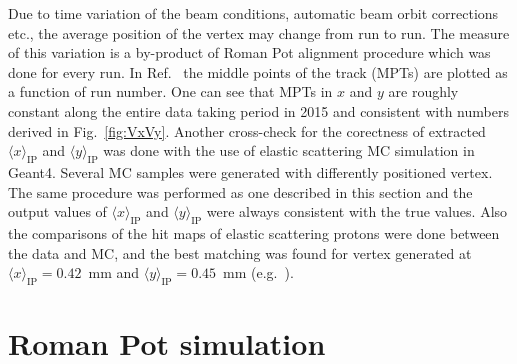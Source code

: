 Due to time variation of the beam conditions, automatic beam orbit corrections etc., the average position of the vertex may change from run to run. The measure of this variation is a by-product of Roman Pot alignment procedure which was done for every run. In Ref.~\cite{AverageVertexBogdan} the middle points of the track (MPTs) are plotted as a function of run number. One can see that MPTs in $x$ and $y$ are roughly constant along the entire data taking period in 2015 and consistent with numbers derived in Fig.~\ref{fig:VxVy}. Another cross-check for the corectness of extracted $\langle x\rangle_{\text{IP}}$ and $\langle y\rangle_{\text{IP}}$ was done with the use of elastic scattering MC simulation in Geant4. Several MC samples were generated with differently positioned vertex. The same procedure was performed as one described in this section and the output values of $\langle x\rangle_{\text{IP}}$ and $\langle y\rangle_{\text{IP}}$ were always consistent with the true values. Also the comparisons of the hit maps of elastic scattering protons were done between the data and MC, and the best matching was found for vertex generated at $\langle x\rangle_{\text{IP}} = 0.42$~mm and $\langle y\rangle_{\text{IP}} = 0.45$~mm (e.g.~\cite{AlignmentValidation}).

\section{Roman Pot simulation}

